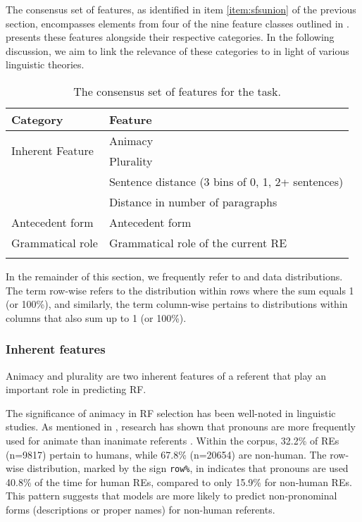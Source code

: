 The consensus set of features, as identified in item \ref{item:sfsunion} of the previous section, encompasses elements from four of the nine feature classes outlined in .  presents these features alongside their respective categories. In the following discussion, we aim to link the relevance of these categories to \context in light of various linguistic theories.


\begin{table}
	\begin{tabular}[t]{ll}
		\lsptoprule
		Category & Feature \\
		\midrule
		\multirow{2}{*}{Inherent Feature} & Animacy \\
		& Plurality  \\
		\tablevspace
		\multirow{2}{*}{Recency} & Sentence distance (3 bins of 0, 1, 2+ sentences) \\
		& Distance in number of paragraphs  \\
		\tablevspace
		Antecedent form & Antecedent form \\
		\tablevspace
		Grammatical role & Grammatical role of the current RE \\
		\lspbottomrule
	\end{tabular}\caption[The consensus set of features for the \context task.]{\label{tab:consensus} The consensus set of features for the \context task.}
\end{table}


In the remainder of this section, we frequently refer to  and  data distributions. The term row-wise refers to the distribution within rows where the sum equals 1 (or 100\%), and similarly, the term column-wise pertains to distributions within columns that also sum up to 1 (or 100\%). 



\subsubsection{Inherent features}

Animacy and plurality are two inherent features of a referent that play an important role in predicting RF. 

The significance of animacy in RF selection has been well-noted in linguistic studies. As mentioned in , research has shown that pronouns are more frequently used for animate than inanimate referents \citep{Dahl1996,fukumura2011effect,vogels2014referential}. Within the \wsj corpus, 32.2\% of REs (n=9817) pertain to humans, while 67.8\% (n=20654) are non-human. The row-wise distribution, marked by the sign \texttt{row\%}, in  indicates that pronouns are used 40.8\% of the time for human REs, compared to only 15.9\% for non-human REs. This pattern suggests that models are more likely to predict non-pronominal forms (descriptions or proper names) for non-human referents. 

